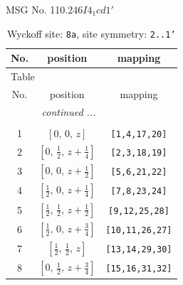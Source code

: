 \documentclass[fleqn,8pt]{jsarticle}
\begin{document}
\setcounter{MaxMatrixCols}{32}

\renewcommand{\tablename}{Table~}
\renewcommand{\figurename}{Figure~}
\begin{center}
\LARGE
MSG No. 110.246\quad$I4_{1}cd1'$
\end{center}
\renewcommand{\arraystretch}{1.2}
\begin{longtable}{ccc}
\caption{Wyckoff site: {\tt 8a}, site symmetry: {\tt 2..1'}}
 \\
 \hline \hline
No. & position & mapping \\ \hline \endfirsthead

\multicolumn{2}{l}{\tablename\ \thetable{}} \\
 \hline \hline
No. & position & mapping \\ \hline \endhead

 \hline \hline
\multicolumn{2}{r}{\footnotesize\it continued ...} \\ \endfoot

 \hline \hline
\multicolumn{2}{r}{} \\ \endlastfoot

1 & $\left[ 0,\, 0,\, z \right]$ & {\tt [1,4,17,20]} \\ \hline
2 & $\left[ 0,\, \frac{1}{2},\, z + \frac{1}{4} \right]$ & {\tt [2,3,18,19]} \\ \hline
3 & $\left[ 0,\, 0,\, z + \frac{1}{2} \right]$ & {\tt [5,6,21,22]} \\ \hline
4 & $\left[ \frac{1}{2},\, 0,\, z + \frac{1}{4} \right]$ & {\tt [7,8,23,24]} \\ \hline
5 & $\left[ \frac{1}{2},\, \frac{1}{2},\, z + \frac{1}{2} \right]$ & {\tt [9,12,25,28]} \\ \hline
6 & $\left[ \frac{1}{2},\, 0,\, z + \frac{3}{4} \right]$ & {\tt [10,11,26,27]} \\ \hline
7 & $\left[ \frac{1}{2},\, \frac{1}{2},\, z \right]$ & {\tt [13,14,29,30]} \\ \hline
8 & $\left[ 0,\, \frac{1}{2},\, z + \frac{3}{4} \right]$ & {\tt [15,16,31,32]} \\
\end{longtable}
\renewcommand{\arraystretch}{1.2}
\end{document}
